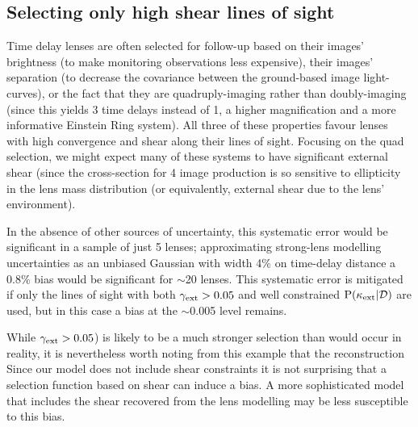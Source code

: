 \documentclass[useAMS,usenatbib,a4paper]{mn2e}
\begin{document}

\subsection{Selecting only high shear lines of sight}
\label{sec:bias:tightPDF}

Time delay lenses are often selected for follow-up based on their images'
brightness (to make monitoring observations less expensive), their images'
separation (to decrease the covariance between the ground-based image
light-curves), or the fact that they are quadruply-imaging rather than
doubly-imaging (since this yields 3 time delays instead of 1, a higher
magnification and a more informative Einstein Ring system). All three of these
properties favour lenses with high convergence and shear along their lines of
sight. Focusing on the quad selection, we might expect many of these systems
to have significant external shear (since the cross-section for 4 image
production is so sensitive to ellipticity in the lens mass distribution (or
equivalently, external shear due to the lens' environment). 

In the absence of other sources of uncertainty, this
systematic error would be significant in a sample of just 5 lenses; 
approximating strong-lens
modelling uncertainties as an unbiased Gaussian with width 4\% on time-delay distance a 0.8\% bias would be
significant for $\sim$20 lenses.
This systematic error is mitigated if only
the lines of sight with both $\gamma_{\rm ext}>0.05$ and well constrained ${\rm P}(\kappa_{\rm ext}|{\mathcal{D}})$ are
used, but in this case a bias at the $\sim$0.005 level remains. 

While $\gamma_{\rm ext}>0.05$) is likely to be a much stronger selection than would
occur in reality, it is  nevertheless worth noting from this example  that the
reconstruction \proceedure {} Since our model does not include shear
constraints it is not surprising that a selection function based on shear can
induce a bias. A more sophisticated model that includes the shear recovered
from the lens modelling may be less susceptible to this bias.
\end{document}
